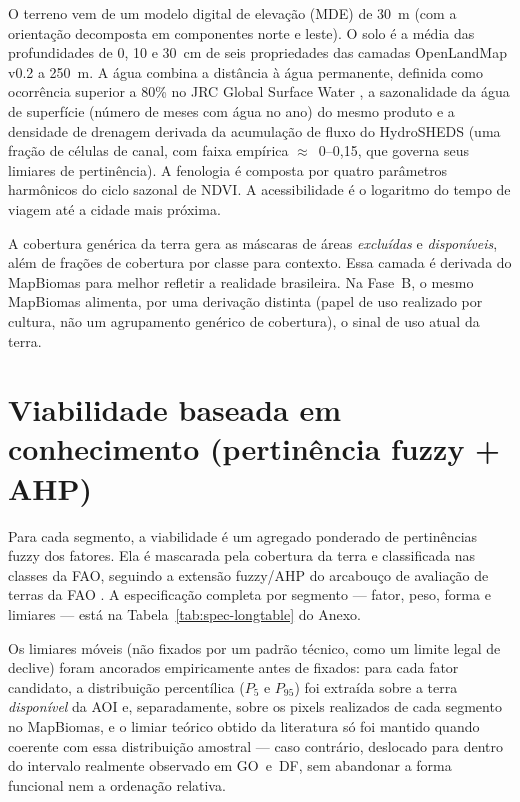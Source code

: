 O terreno vem de um modelo digital de elevação (MDE) de 30~m (com a orientação decomposta em
componentes norte e leste). O solo é a média das profundidades de 0, 10 e 30~cm de seis
propriedades das camadas OpenLandMap v0.2 a 250~m.
A água combina a distância à água permanente, definida como ocorrência superior a 80\% no JRC Global
Surface Water \citep{pekel_high-resolution_2016}, a sazonalidade da água de superfície (número de meses
com água no ano) do mesmo produto e a densidade de drenagem derivada da acumulação de fluxo do
HydroSHEDS (uma fração de células de canal, com faixa empírica $\approx$~0--0,15, que governa seus
limiares de pertinência). A fenologia é composta
por quatro parâmetros harmônicos do ciclo sazonal de NDVI. A acessibilidade é o logaritmo do tempo
de viagem até a cidade mais próxima.

A cobertura genérica da terra gera as máscaras de áreas \emph{excluídas} e \emph{disponíveis}, além
de frações de cobertura por classe para contexto. Essa camada é derivada do MapBiomas
para melhor refletir a realidade brasileira. 
Na Fase~B, o mesmo MapBiomas alimenta,
por uma derivação distinta (papel de uso realizado por cultura, não um agrupamento genérico de
cobertura), o sinal de uso atual da terra.

\section{Viabilidade baseada em conhecimento (pertinência fuzzy + AHP)}\label{sec:suitability}

Para cada segmento, a viabilidade é um agregado ponderado de pertinências fuzzy dos fatores. Ela é
mascarada pela cobertura da terra e classificada nas classes da FAO, seguindo a extensão fuzzy/AHP
do arcabouço de avaliação de terras da FAO \citep{nisar_ahamed_gis-based_2000,yaghmaeian_mahabadi_land_2012}. A
especificação completa por segmento --- fator, peso, forma e limiares --- está na Tabela~\ref{tab:spec-longtable} do Anexo.

Os limiares móveis (não fixados por um padrão técnico, como um limite legal de declive) foram
ancorados empiricamente antes de fixados: para cada fator candidato, a distribuição percentílica
($P_5 \text{~e~} P_{95}$) foi extraída sobre a terra \emph{disponível} da AOI e, separadamente, sobre os
pixels realizados de cada segmento no MapBiomas, e o limiar teórico obtido da literatura só foi mantido quando 
coerente com essa distribuição amostral --- caso contrário, deslocado para dentro do intervalo realmente observado 
em GO~e~DF, sem abandonar a forma funcional nem a ordenação relativa.

